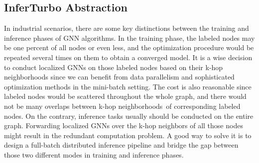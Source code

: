 \documentclass[conference]{IEEEtran}
\begin{document}
\subsection{InferTurbo Abstraction}
In industrial scenarios, there are some key distinctions between the training and inference phases of GNN algorithms. 
In the training phase, the labeled nodes may be one percent of all nodes or even less, and the optimization procedure would be repeated several times on them to obtain a converged model.
It is a wise decision to conduct localized GNNs on those labeled nodes based on their k-hop neighborhoods since we can benefit from data parallelism and sophisticated optimization methods in the mini-batch setting.
The cost is also reasonable since labeled nodes would be scattered throughout the whole graph, and there would not be many overlaps between k-hop neighborhoods of corresponding labeled nodes.
On the contrary, inference tasks usually should be conducted on the entire graph.
Forwarding localized GNNs over the k-hop neighbors of all those nodes might result in the redundant computation problem.
A good way to solve it is to design a full-batch distributed inference pipeline and bridge the gap between those two different modes in training and inference phases. 
\end{document}
